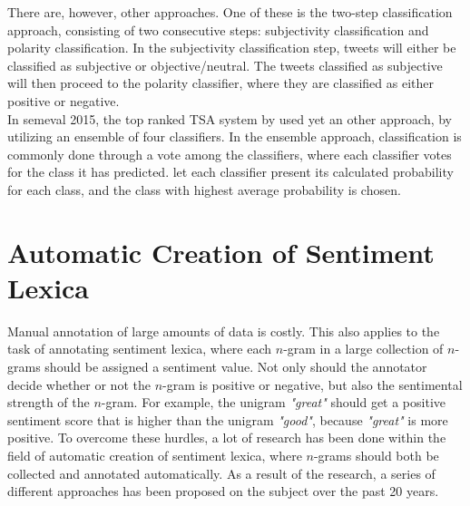 There are, however, other approaches. One of these is the two-step classification approach, consisting of two consecutive steps: subjectivity classification and polarity classification. In the subjectivity classification step, tweets will either be classified as subjective or objective/neutral. The tweets classified as subjective will then proceed to the polarity classifier, where they are classified as either positive or negative. \\

In \ac{semeval} 2015, the top ranked TSA system by \cite{Webis15} used yet an other approach, by utilizing an ensemble of four classifiers. In the ensemble approach, classification is commonly done through a vote among the classifiers, where each classifier votes for the class it has predicted. \citeauthor{Webis15} let each classifier present its calculated probability for each class, and the class with highest average probability is chosen.  


\section{Automatic Creation of Sentiment Lexica}
\label{sec:automatic_generation_of_sentiment_lexica}
Manual annotation of large amounts of data is costly. This also applies to the task of annotating sentiment lexica, where each $n$-gram in a large collection of $n$-grams should be assigned a sentiment value. Not only should the annotator decide whether or not the $n$-gram is positive or negative, but also the sentimental strength of the $n$-gram. For example, the unigram \textit{"great"} should get a positive sentiment score that is higher than the unigram \textit{"good"}, because \textit{"great"} is more positive. To overcome these hurdles, a lot of research has been done within the field of automatic creation of sentiment lexica, where $n$-grams should both be collected and annotated automatically. As a result of the research, a series of different approaches has been proposed on the subject over the past 20 years. 


